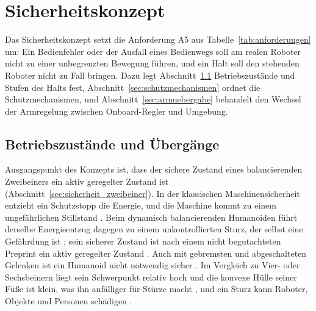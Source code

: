 
\section{Sicherheitskonzept}
\label{sec:sicherheitskonzept}
Das Sicherheitskonzept setzt die Anforderung A5 aus Tabelle~\ref{tab:anforderungen} um: Ein Bedienfehler oder der Ausfall eines Bedienwegs soll am realen Roboter nicht zu einer unbegrenzten Bewegung führen, und ein Halt soll den stehenden Roboter nicht zu Fall bringen.
Dazu legt Abschnitt~\ref{sec:zustaende} Betriebszustände und Stufen des Halts fest, Abschnitt~\ref{sec:schutzmechanismen} ordnet die Schutzmechanismen, und Abschnitt~\ref{sec:armuebergabe} behandelt den Wechsel der Armregelung zwischen Onboard-Regler und Umgebung.

\subsection{Betriebszustände und Übergänge}
\label{sec:zustaende}

Ausgangspunkt des Konzepts ist, dass der sichere Zustand eines balancierenden Zweibeiners ein aktiv geregelter Zustand ist (Abschnitt~\ref{sec:sicherheit_zweibeiner}).
In der klassischen Maschinensicherheit entzieht ein Schutzstopp die Energie, und die Maschine kommt zu einem ungefährlichen Stillstand \cite{Ding2026}.
Beim dynamisch balancierenden Humanoiden führt derselbe Energieentzug dagegen zu einem unkontrollierten Sturz, der selbst eine Gefährdung ist \cite{Ding2026}; sein sicherer Zustand ist nach einem nicht begutachteten Preprint ein aktiv geregelter Zustand \cite{Ding2026}.
Auch mit gebremsten und abgeschalteten Gelenken ist ein Humanoid nicht notwendig sicher \cite{Prather2025}.
Im Vergleich zu Vier- oder Sechsbeinern liegt sein Schwerpunkt relativ hoch und die konvexe Hülle seiner Füße ist klein, was ihn anfälliger für Stürze macht \cite{Subburaman2023}, und ein Sturz kann Roboter, Objekte und Personen schädigen \cite{Subburaman2023}.

